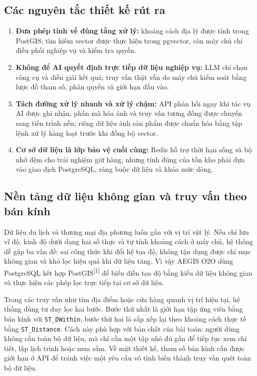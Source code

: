 \documentclass[12pt, a4paper]{article}
\begin{document}
\subsection{Các nguyên tắc thiết kế rút ra}
\begin{enumerate}
    \item \textbf{Đưa phép tính về đúng tầng xử lý:} khoảng cách địa lý được tính trong PostGIS, tìm kiếm vector được thực hiện trong pgvector, còn máy chủ chỉ điều phối nghiệp vụ và kiểm tra quyền.
    \item \textbf{Không để AI quyết định trực tiếp dữ liệu nghiệp vụ:} LLM chỉ chọn công cụ và diễn giải kết quả; truy vấn thật vẫn do máy chủ kiểm soát bằng lược đồ tham số, phân quyền và giới hạn đầu vào.
    \item \textbf{Tách đường xử lý nhanh và xử lý chậm:} API phản hồi ngay khi tác vụ AI được ghi nhận, phần mã hóa ảnh và truy vấn tương đồng được chuyển sang tiến trình nền; riêng dữ liệu ảnh sản phẩm được chuẩn hóa bằng tập lệnh xử lý hàng loạt trước khi đồng bộ vector.
    \item \textbf{Cơ sở dữ liệu là lớp bảo vệ cuối cùng:} Redis hỗ trợ thời hạn sống và bộ nhớ đệm cho trải nghiệm giữ hàng, nhưng tính đúng của tồn kho phải dựa vào giao dịch PostgreSQL, ràng buộc dữ liệu và khóa mức dòng.
\end{enumerate}

\subsection{Nền tảng dữ liệu không gian và truy vấn theo bán kính}
\label{sec:tech_spatial}
Dữ liệu du lịch và thương mại địa phương luôn gắn với vị trí vật lý. Nếu chỉ lưu vĩ độ, kinh độ dưới dạng hai số thực và tự tính khoảng cách ở máy chủ, hệ thống dễ gặp ba vấn đề: sai công thức khi đổi hệ tọa độ, không tận dụng được chỉ mục không gian và khó lọc hiệu quả khi dữ liệu tăng. Vì vậy AEGIS O2O dùng PostgreSQL kết hợp PostGIS\textsuperscript{[1]} để biểu diễn tọa độ bằng kiểu dữ liệu không gian và thực hiện các phép lọc trực tiếp tại cơ sở dữ liệu.

Trong các truy vấn như tìm địa điểm hoặc cửa hàng quanh vị trí hiện tại, hệ thống dùng tư duy lọc hai bước. Bước thứ nhất là giới hạn tập ứng viên bằng bán kính với \texttt{ST\_DWithin}; bước thứ hai là sắp xếp lại theo khoảng cách thực tế bằng \texttt{ST\_Distance}. Cách này phù hợp với bản chất của bài toán: người dùng không cần toàn bộ dữ liệu, mà chỉ cần một tập nhỏ đủ gần để tiếp tục xem chi tiết, lập lịch trình hoặc mua sắm. Về mặt thiết kế, tham số bán kính cần được giới hạn ở API để tránh việc một yêu cầu vô tình biến thành truy vấn quét toàn bộ dữ liệu.
\end{document}
